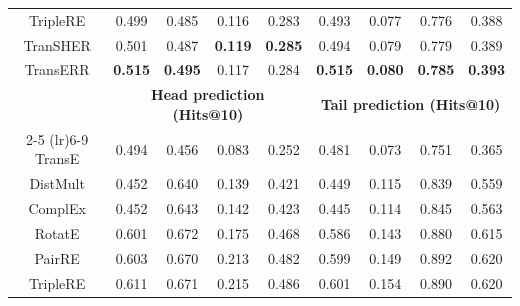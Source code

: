 \documentclass[10pt, a4paper]{article}
\begin{document}
\begin{table}[!htb]
{\begin{tabular}{ccccccccc}
				TripleRE             & 0.499                                                  & 0.485                                                  & 0.116          & 0.283          & 0.493          & 0.077          & 0.776          & 0.388          \\
				TranSHER            & 0.501                                                  & 0.487                                                 & \textbf{0.119}          & \textbf{0.285}          & 0.494          & 0.079          & 0.779          & 0.389         \\
				TransERR            & \textbf{0.515}                                         & \textbf{0.495}                                         & 0.117 & 0.284 & \textbf{0.515} & \textbf{0.080} & \textbf{0.785} & \textbf{0.393} \\ \hline \hline
								   & \multicolumn{4}{c}{\textbf{Head prediction (Hits@10)}} & \multicolumn{4}{c}{\textbf{Tail prediction (Hits@10)}}                                                                                                       \\  \cmidrule(lr){2-5} \cmidrule(lr){6-9}
				TransE             & 0.494                                                  & 0.456                                                  & 0.083          & 0.252          & 0.481          & 0.073          & 0.751          & 0.365          \\
				DistMult           & 0.452                                                  & 0.640                                                  & 0.139          & 0.421          & 0.449          & 0.115          & 0.839          & 0.559          \\
				ComplEx            & 0.452                                                  & 0.643                                                  & 0.142          & 0.423          & 0.445          & 0.114          & 0.845          & 0.563          \\
				RotatE             & 0.601                                                  & 0.672                                                  & 0.175          & 0.468          & 0.586          & 0.143          & 0.880          & 0.615          \\
				PairRE             & 0.603                                                  & 0.670                                                  & 0.213          & 0.482          & 0.599          & 0.149          & 0.892          & 0.620          \\
				TripleRE             & 0.611                                                  & 0.671                                                  & 0.215          & 0.486          & 0.601          & 0.154          & 0.890          & 0.620          \\

\end{tabular}}
\end{table}
\end{document}
